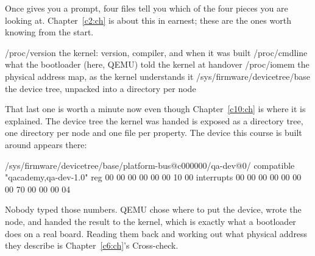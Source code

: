 Once  gives you a prompt, four files tell you which of the four pieces you are
looking at. Chapter~\ref{c2:ch} is about this in earnest; these are the ones worth knowing from the
start.

\begin{console}
/proc/version      the kernel: version, compiler, and when it was built
/proc/cmdline      what the bootloader (here, QEMU) told the kernel at handover
/proc/iomem        the physical address map, as the kernel understands it
/sys/firmware/devicetree/base
                   the device tree, unpacked into a directory per node
\end{console}

\noindent That last one is worth a minute now even though Chapter~\ref{c10:ch} is where it is
explained. The device tree the kernel was handed is exposed as a directory tree, one directory per
node and one file per property. The device this course is built around appears there:

\begin{console}
/sys/firmware/devicetree/base/platform-bus@c000000/qa-dev@0/
    compatible      "qacademy,qa-dev-1.0"
    reg             00 00 00 00 00 00 10 00
    interrupts      00 00 00 00 00 00 00 70 00 00 00 04
\end{console}

\noindent Nobody typed those numbers. QEMU chose where to put the device, wrote the node, and handed
the result to the kernel, which is exactly what a bootloader does on a real board. Reading them back
and working out what physical address they describe is Chapter~\ref{c6:ch}'s Cross-check.
